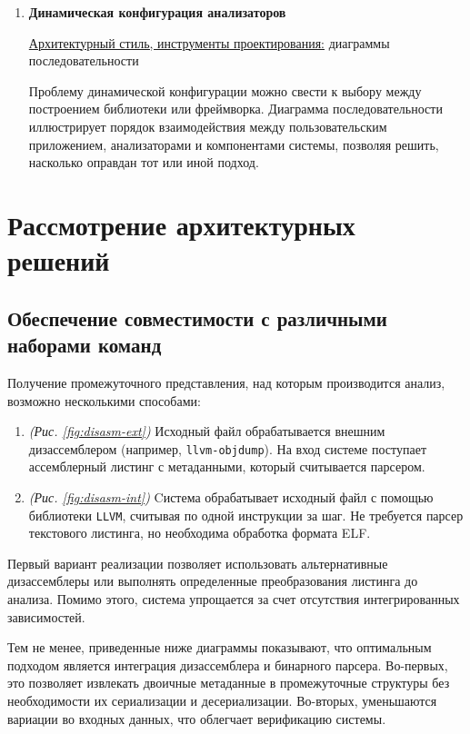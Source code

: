 \documentclass[listings]{labreport}
\begin{document}
\begin{enumerate}
\item \textbf{Динамическая конфигурация анализаторов}

\uline{Архитектурный стиль, инструменты проектирования:} диаграммы последовательности

Проблему динамической конфигурации можно свести к выбору между построением библиотеки
или фреймворка. Диаграмма последовательности иллюстрирует порядок взаимодействия
между пользовательским приложением, анализаторами и компонентами системы, позволяя
решить, насколько оправдан тот или иной подход.

\end{enumerate}

\newpage
\section*{Рассмотрение архитектурных решений}

\subsection*{Обеспечение совместимости с различными наборами команд}

Получение промежуточного представления, над которым производится анализ,
возможно несколькими способами:
\begin{enumerate}[noitemsep,topsep=0em]
\item \textit{(Рис. \ref{fig:disasm-ext})} Исходный файл обрабатывается внешним дизассемблером (например, \verb|llvm-objdump|). На вход системе поступает ассемблерный листинг с метаданными, который считывается парсером.
\item \textit{(Рис. \ref{fig:disasm-int})} Cистема обрабатывает исходный файл с помощью библиотеки \verb|LLVM|, считывая по одной инструкции за шаг. Не требуется парсер текстового листинга, но необходима обработка формата ELF.
\end{enumerate}
\vspace{0.4em}

Первый вариант реализации позволяет использовать альтернативные дизассемблеры
или выполнять определенные преобразования листинга до анализа. Помимо этого,
система упрощается за счет отсутствия интегрированных зависимостей.

Тем не менее, приведенные ниже диаграммы показывают, что оптимальным подходом
является интеграция дизассемблера и бинарного парсера.
Во-первых, это позволяет извлекать двоичные метаданные в промежуточные структуры
без необходимости их сериализации и десериализации. Во-вторых, уменьшаются
вариации во входных данных, что облегчает верификацию системы.
\end{document}
